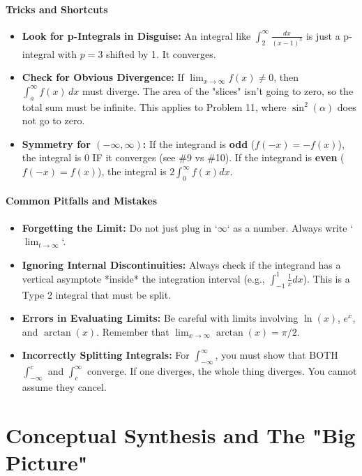 \documentclass{article}
\begin{document}
\subsection{Tricks and Shortcuts}
\begin{itemize}
    \item \textbf{Look for p-Integrals in Disguise:} An integral like $\int_2^\infty \frac{dx}{(x-1)^3}$ is just a p-integral with $p=3$ shifted by 1. It converges.
    \item \textbf{Check for Obvious Divergence:} If $\lim_{x \to \infty} f(x) \neq 0$, then $\int_a^\infty f(x) \,dx$ must diverge. The area of the "slices" isn't going to zero, so the total sum must be infinite. This applies to Problem 11, where $\sin^2(\alpha)$ does not go to zero.
    \item \textbf{Symmetry for $(-\infty, \infty)$:} If the integrand is \textbf{odd} ($f(-x) = -f(x)$), the integral is 0 IF it converges (see \#9 vs \#10). If the integrand is \textbf{even} ($f(-x)=f(x)$), the integral is $2\int_0^\infty f(x) dx$.
\end{itemize}

\subsection{Common Pitfalls and Mistakes}
\begin{itemize}
    \item \textbf{Forgetting the Limit:} Do not just plug in `$\infty$` as a number. Always write `$\lim_{t \to \infty}$`.
    \item \textbf{Ignoring Internal Discontinuities:} Always check if the integrand has a vertical asymptote *inside* the integration interval (e.g., $\int_{-1}^1 \frac{1}{x} dx$). This is a Type 2 integral that must be split.
    \item \textbf{Errors in Evaluating Limits:} Be careful with limits involving $\ln(x)$, $e^x$, and $\arctan(x)$. Remember that $\lim_{x\to\infty} \arctan(x) = \pi/2$.
    \item \textbf{Incorrectly Splitting Integrals:} For $\int_{-\infty}^\infty$, you must show that BOTH $\int_{-\infty}^c$ and $\int_c^\infty$ converge. If one diverges, the whole thing diverges. You cannot assume they cancel.
\end{itemize}

\part{Conceptual Synthesis and The "Big Picture"}
\end{document}
